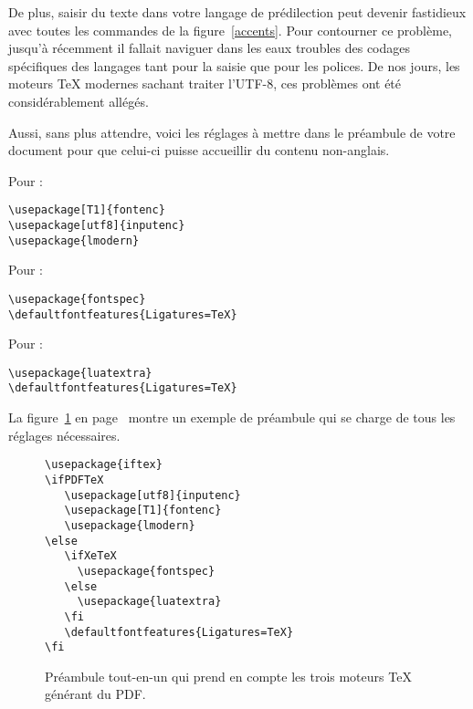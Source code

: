 De plus, saisir du texte dans votre langage de prédilection peut
devenir fastidieux avec toutes les commandes de la
figure~\ref{accents}. Pour contourner ce problème, jusqu'à récemment
il fallait naviguer dans les eaux troubles des codages spécifiques des
langages tant pour la saisie que pour les polices. De nos jours, les
moteurs \TeX{} modernes sachant traiter l'UTF-8, ces problèmes ont été
considérablement allégés.

Aussi, sans plus attendre, voici les réglages à mettre dans le
préambule de votre document pour que celui-ci puisse accueillir du
contenu non-anglais.

Pour :

\begin{lscommand}
\verb|\usepackage[T1]{fontenc}|\\
\verb|\usepackage[utf8]{inputenc}|\\
\verb|\usepackage{lmodern}|
\end{lscommand}

Pour :

\begin{lscommand}
\verb|\usepackage{fontspec}|\\
\verb|\defaultfontfeatures{Ligatures=TeX}|
\end{lscommand}

Pour :

\begin{lscommand}
\verb|\usepackage{luatextra}|\\
\verb|\defaultfontfeatures{Ligatures=TeX}|
\end{lscommand}

La figure~\ref{allinone} en page~\pageref{allinone} montre un exemple
de préambule qui se charge de tous les réglages nécessaires.

\begin{figure}[!bp]
\begin{lined}{10cm}
\begin{verbatim}
\usepackage{iftex}
\ifPDFTeX
   \usepackage[utf8]{inputenc}
   \usepackage[T1]{fontenc}
   \usepackage{lmodern}
\else
   \ifXeTeX
     \usepackage{fontspec}
   \else
     \usepackage{luatextra}
   \fi
   \defaultfontfeatures{Ligatures=TeX}
\fi
\end{verbatim}
\end{lined}
\caption[Préambule tout-en-un]{Préambule tout-en-un qui prend en compte les trois moteurs \TeX{} générant du PDF.} \label{allinone}
\end{figure}



